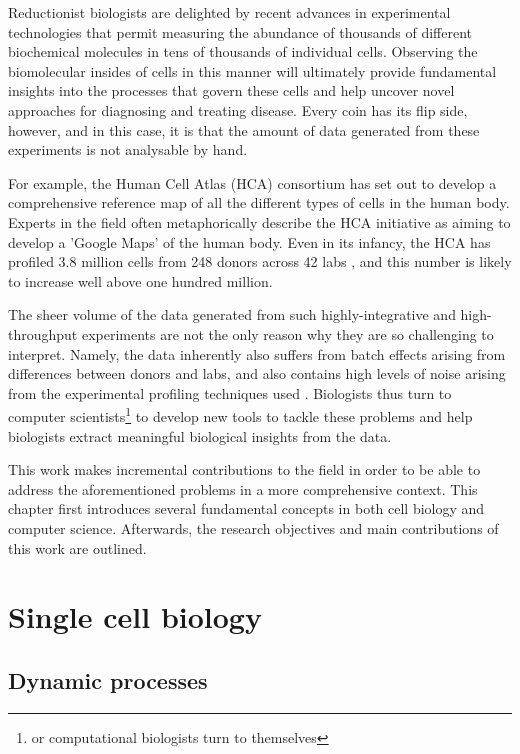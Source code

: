 Reductionist biologists are delighted by recent advances in experimental technologies that permit measuring the abundance of thousands of different biochemical molecules in tens of thousands of individual cells.  Observing the biomolecular insides of cells in this manner will ultimately provide fundamental insights into the processes that govern these cells and help uncover novel approaches for diagnosing and treating disease. Every coin has its flip side, however, and in this case, it is that the amount of data generated from these experiments is not analysable by hand.  

For example, the Human Cell Atlas (HCA) consortium \cite{regev_humancellatlas_2018} has set out to develop a comprehensive reference map of all the different types of cells in the human body. Experts in the field often metaphorically describe the HCA initiative as aiming to develop a 'Google Maps' of the human body. Even in its infancy, the HCA has profiled 3.8 million cells from 248 donors across 42 labs \cite{humancellatlasconsortium_humancellatlas_2018}, and this number is likely to increase well above one hundred million.

The sheer volume of the data generated from such highly-integrative and high-throughput experiments are not the only reason why they are so challenging to interpret. Namely, the data inherently also suffers from batch effects arising from differences between donors and labs, and also contains high levels of noise arising from the experimental profiling techniques used \cite{hon_humancellatlas_2018}. Biologists thus turn to computer scientists\footnote{or computational biologists turn to themselves} to develop new tools to tackle these problems and help biologists extract meaningful biological insights from the data.

This work makes incremental contributions to the field in order to be able to address the aforementioned problems in a more comprehensive context. This chapter first introduces several fundamental concepts in both cell biology and computer science. Afterwards, the research objectives and main contributions of this work are outlined.


\section{Single cell biology}

\subsection{Dynamic processes}

